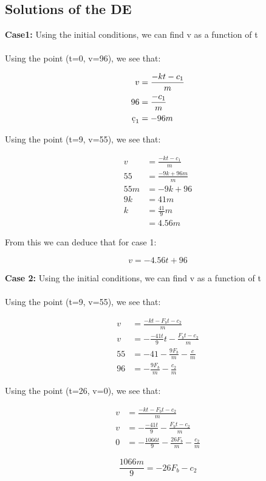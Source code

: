 \subsection{Solutions of the DE}
\textbf{Case1: } 
Using the initial conditions, we can find v as a function of t
\\ \\
Using the point (t=0, v=96), we see that:
\begin{center}
\begin{align*}
    v &= \frac{-kt - c_1}{m}
    \\ 96 &= \frac{-c_1}{m}
    \\ \d c_1 &= -96m
\end{align*}
\end{center}
Using the point (t=9, v=55), we see that:
\begin{center}
\begin{align*}
    v &= \frac{-kt - c_1}{m}
    \\ 55 &= \frac{-9k+96m}{m}
    \\ 55m &= -9k + 96
    \\ 9k &= 41m
    \\ k &= \frac{41}{9}m
    \\ &= 4.56m
\end{align*}
\end{center}

From this we can deduce that for case 1:

\begin{equation}
    \boxed{v = -4.56t + 96}
\end{equation}

\textbf{Case 2: } 
Using the initial conditions, we can find v as a function of t
\\ \\
Using the point (t=9, v=55), we see that:
\begin{center}
\begin{align*}
    v &= \frac{-kt-F_bt-c_2}{m}
    \\ v &= -\frac{-41t}{9}t - \frac{F_bt - c_2}{m}
    \\ 55 &= -41 - \frac{9F_b}{m} -\frac{c}{m}
    \\ 96 &= -\frac{9F_b}{m} - \frac{c_2}{m}
\end{align*}
\end{center}
Using the point (t=26, v=0), we see that:
\begin{center}
\begin{align*}
    v &= \frac{-kt-F_bt-c_2}{m}
    \\ v &= -\frac{-41t}{9} - \frac{F_bt - c_2}{m}
    \\ 0 &= -\frac{1066t}{9} - \frac{26F_b}{m} -\frac{c_2}{m}
\end{align*}
\end{center}
\begin{equation}
     \frac{1066m}{9} = -26F_b - c_2
\end{equation}


